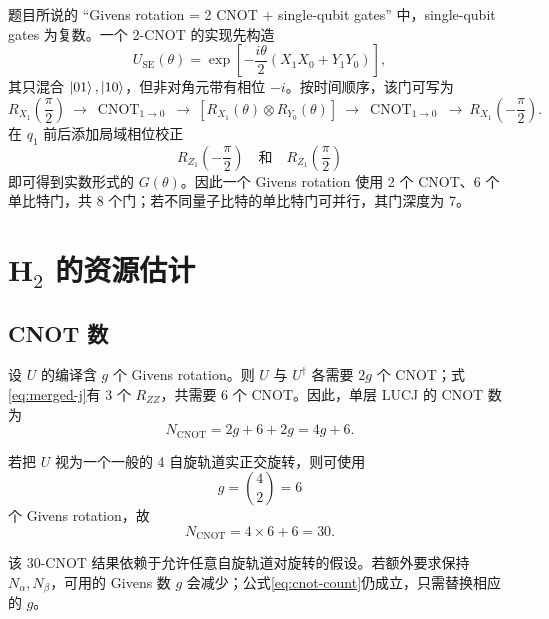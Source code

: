 \documentclass[11pt,a4paper]{ctexart}
\newcommand{\CNOT}{\operatorname{CNOT}}
\newcommand{\RZ}{R_{Z}}
\newcommand{\RX}{R_{X}}
\newcommand{\RY}{R_{Y}}
\begin{document}
题目所说的 ``Givens rotation = 2 CNOT + single-qubit gates'' 中，single-qubit gates 为复数。一个 2-CNOT 的实现先构造
\begin{equation}
U_{\mathrm{SE}}(\theta)=\exp\!\left[-\frac{i\theta}{2}(X_1X_0+Y_1Y_0)\right],
\end{equation}
其只混合 $\ket{01},\ket{10}$，但非对角元带有相位 $-i$。按时间顺序，该门可写为
\begin{equation}
\RX_1\!\left(\frac{\pi}{2}\right)
\ \longrightarrow\ \CNOT_{1\to0}
\ \longrightarrow\ \left[\RX_1(\theta)\otimes\RY_0(\theta)\right]
\ \longrightarrow\ \CNOT_{1\to0}
\ \longrightarrow\ \RX_1\!\left(-\frac{\pi}{2}\right).
\label{eq:single-excitation}
\end{equation}
在 $q_1$ 前后添加局域相位校正
\begin{equation}
\RZ_1\!\left(-\frac{\pi}{2}\right)
\quad\text{和}\quad
\RZ_1\!\left(\frac{\pi}{2}\right)
\end{equation}
即可得到实数形式的 $G(\theta)$。因此一个 Givens rotation 使用 2 个 CNOT、6 个单比特门，共 8 个门；若不同量子比特的单比特门可并行，其门深度为 7。

\section{H$_2$ 的资源估计}

\subsection{CNOT 数}

设 $U$ 的编译含 $g$ 个 Givens rotation。则 $U$ 与 $U^\dagger$ 各需要 $2g$ 个 CNOT；式\eqref{eq:merged-j}有 3 个 $R_{ZZ}$，共需要 6 个 CNOT。因此，单层 LUCJ 的 CNOT 数为
\begin{equation}
    N_{\mathrm{CNOT}}=2g+6+2g=4g+6.
    \label{eq:cnot-count}
\end{equation}

若把 $U$ 视为一个一般的 4 自旋轨道实正交旋转，则可使用
\begin{equation}
    g=\binom{4}{2}=6
\end{equation}
个 Givens rotation，故
\begin{equation}
    \boxed{N_{\mathrm{CNOT}}=4\times6+6=30.}
\end{equation}

该 30-CNOT 结果依赖于允许任意自旋轨道对旋转的假设。若额外要求保持 $N_\alpha,N_\beta$，可用的 Givens 数 $g$ 会减少；公式\eqref{eq:cnot-count}仍成立，只需替换相应的 $g$。
\end{document}
